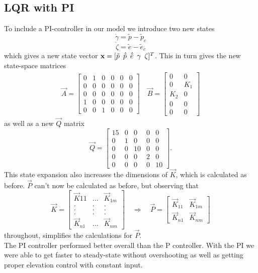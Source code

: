\subsection{LQR with PI}

To include a PI-controller in our model we introduce two new states 
$$  \dot{\gamma} = \tilde{p} - \tilde{p}_c $$ 
$$  \dot{\zeta} = \tilde{e} - \tilde{e}_c  $$
which gives a new state vector 
$\vec{x} = [\tilde{p} \enskip \dot{\tilde{p}} \enskip \dot{\tilde{e}} \enskip \gamma \enskip \zeta]^T$. This in turn gives the new state-space matrices
\begin{align*}
    \vec{A} =   \begin{bmatrix}
                    0&1&0&0&0&0\\
                    0&0&0&0&0&0\\
                    0&0&0&0&0&0\\
                    1&0&0&0&0&0\\
                    0&0&1&0&0&0
                \end{bmatrix}
        \quad
    \vec{B} =   \begin{bmatrix}
                    0&0\\
                    0&K_1\\
                    K_2&0\\
                    0&0\\
                    0&0
                \end{bmatrix}
\end{align*}
as well as a new $\vec{Q}$ matrix 
$$\vec{Q} = \begin{bmatrix}
                15&0&0&0&0\\
                0&1&0&0&0\\
                0&0&10&0&0\\
                0&0&0&2&0\\
                0&0&0&0&10
            \end{bmatrix}.
$$
This state expansion also increases the dimensions of $\vec{K}$, which is calculated as before. $\vec{P}$ can't now be calculated as before, but observing that 
$$
\vec{K} =   \begin{bmatrix}
                \vec{K}{11} & ... & \vec{K}_{1m}\\
                .&.&.\\
                .&.&.\\
                .&.&.\\
                \vec{K}_{n1} & ... & \vec{K}_{nm}
            \end{bmatrix}
    \quad \Rightarrow \quad
\vec{P} =   \begin{bmatrix}
                \vec{K}_{11} & \vec{K}_{1m}\\
                \vec{K}_{n1} & \vec{K}_{nm}
            \end{bmatrix}
$$
throughout, simplifies the calculations for $\vec{P}$.\\
The PI controller performed better overall than the P controller. With the PI we were able to get faster to steady-state without overshooting as well as getting proper elevation control with constant input.